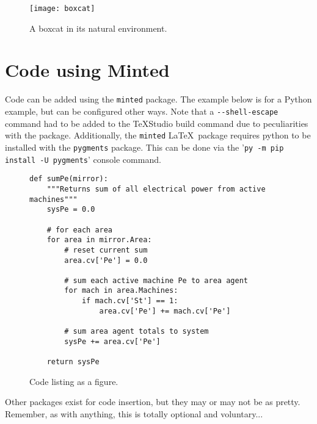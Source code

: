 \begin{figure}[!ht]
	\centering
	\footnotesize
	\texttt{[image: boxcat]}
	\caption{A boxcat in its natural environment.}
	\label{fig: boxcat}
\end{figure}\vspace{-1em} %

\section{Code using Minted}
Code can be added using the \verb|minted| package. The example below is for a Python example, but can be configured other ways. Note that a \verb|--shell-escape| command had to be added to the \TeX Studio build command due to peculiarities with the package. 
Additionally, the \verb|minted| \LaTeX\ package requires python to be installed with the \verb|pygments| package.
This can be done via the '\verb|py -m pip install -U pygments|' console command.

\begin{figure}[!ht]
\begin{verbatim}
def sumPe(mirror):
    """Returns sum of all electrical power from active machines"""
    sysPe = 0.0

    # for each area
    for area in mirror.Area:
        # reset current sum
        area.cv['Pe'] = 0.0

        # sum each active machine Pe to area agent
        for mach in area.Machines:
            if mach.cv['St'] == 1:
                area.cv['Pe'] += mach.cv['Pe']

        # sum area agent totals to system
        sysPe += area.cv['Pe']

    return sysPe
\end{verbatim}
	\centering
	\footnotesize
	\caption{Code listing as a figure.}
	\label{fig: codeTest}
\end{figure}\vspace{-1em} %

Other packages exist for code insertion, but they may or may not be as pretty. Remember, as with anything, this is totally optional and voluntary...